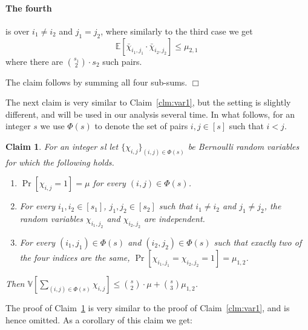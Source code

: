 \documentclass{article}
\newcommand{\Ex}{\mathbb{E}}
\newcommand{\Var}{\mathbb{V}}
\newenvironment{proof}{\smallskip\noindent{\bf Proof:}}%
        {\hspace*{\fill}$\Box$\par}
\newtheorem{claim}[lemma]{Claim}
\begin{document}
\begin{proof}
\paragraph{The fourth} is over $i_1 \neq i_2$ and $j_1 = j_2$, where similarly to the third case we get
\begin{equation}\label{eq:cheb-case4}
\Ex[\bar{\chi}_{i_1,j_1}\cdot \bar{\chi}_{i_2,j_2}]  %
\leq %
\mu_{2,1}\;
\end{equation}
where there are ${s_1\choose 2}\cdot s_2$ such pairs.

The claim follows by summing all four sub-sums.
\end{proof}


The next claim is very similar to Claim~\ref{clm:var1}, but the setting is slightly different, and will be used in our analysis several time.
In what follows, for an integer $s$ we use $\Phi(s)$ to denote the set of pairs $i,j\in [s]$ such that $i<j$.
\begin{claim}\label{clm:var2}
For an integer $s$l let $\{\chi_{i,j}\}_{(i,j)\in \Phi(s)}$ be Bernoulli random variables for which the following holds.
\begin{enumerate}
\item  $\Pr[\chi_{i,j} = 1] = \mu$ for every $(i,j)\in \Phi(s)$.
\item For every $i_1,i_2 \in [s_1]$, $j_1,j_2\in [s_2]$ such that $i_1\neq i_2$ and $j_1\neq j_2$,
the random variables $\chi_{i_1,j_2}$ and $\chi_{i_2,j_2}$ are independent.
\item For every $(i_1,j_1)\in \Phi(s)$ and $(i_2,j_2)\in \Phi(s)$  such that exactly two of the four indices are the same,
$\Pr[\chi_{i_1,j_1}=\chi_{i_2,j_2} = 1] = \mu_{1,2}$.
\end{enumerate}
Then $\Var\left[\sum_{(i,j)\in \Phi(s)}\chi_{i,j}\right] \leq {s\choose 2}\cdot \mu + {s\choose 3}\mu_{1,2}$.
\end{claim}
The proof of Claim~\ref{clm:var2} is very similar to the proof of Claim~\ref{clm:var1}, and is hence omitted. As a corollary of this claim we get:
\end{document}
